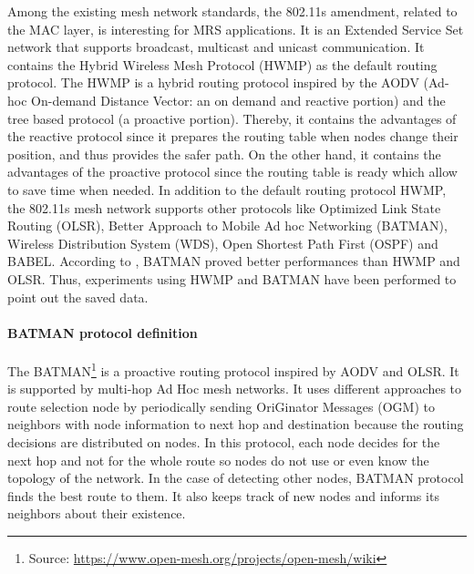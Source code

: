 \documentclass[11pt,openany]{book}
\begin{document}
Among the existing mesh network standards, the 802.11s amendment, related to the MAC layer, is interesting for MRS applications. It is an Extended Service Set network that supports broadcast, multicast and unicast communication. It contains the Hybrid Wireless Mesh Protocol (HWMP) as the default routing protocol. The HWMP is a hybrid routing protocol inspired by the AODV (Ad-hoc On-demand Distance Vector: an on demand and reactive portion) and the tree based protocol (a proactive portion). Thereby, it contains the advantages of the reactive protocol since it prepares the routing table when nodes change their position, and thus provides the safer path. On the other hand, it contains the advantages of the proactive protocol since the routing table is ready which allow to save time when needed. In addition to the default routing protocol HWMP, the 802.11s mesh network supports other protocols like Optimized Link State Routing (OLSR), Better Approach to Mobile Ad hoc Networking (BATMAN), Wireless Distribution System (WDS), Open Shortest Path First (OSPF) and BABEL. According to \cite{wang2010experimental}, BATMAN proved better performances than HWMP and OLSR. Thus, experiments using HWMP and BATMAN have been performed to point out the saved data.
\paragraph{BATMAN protocol  definition}
The BATMAN\footnote{Source: \url{https://www.open-mesh.org/projects/open-mesh/wiki}} is a proactive routing protocol inspired by AODV and OLSR. It is supported by multi-hop Ad Hoc mesh networks. It uses diﬀerent approaches to route selection node by periodically sending OriGinator Messages (OGM) to neighbors with node information to next hop and destination because the routing decisions are distributed on nodes. In this protocol, each node decides for the next hop and not for the whole route so nodes do not use or even know the topology of the network. In the case of detecting other nodes, BATMAN protocol ﬁnds the best route to them. It also keeps track of new nodes and informs its neighbors about their existence.
\end{document}
